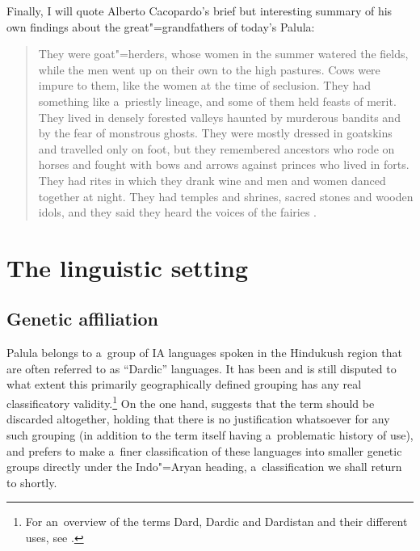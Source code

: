 Finally, I will quote Alberto Cacopardo's brief but interesting summary of his own findings about the great"=grandfathers of today's Palula:

\begin{quote}
They were goat"=herders, whose women in the summer watered the fields, while the men went up on their
own to the high pastures. Cows were impure to them, like the women at the time of seclusion. They
had something like a~priestly lineage, and some of them held feasts of merit. They lived in densely
forested valleys haunted by murderous bandits and by the fear of monstrous ghosts. They were mostly
dressed in goatskins and travelled only on foot, but they remembered ancestors who rode on horses
and fought with bows and arrows against princes who lived in forts. They had rites in which they
drank wine and men and women danced together at night. They had temples and shrines, sacred stones
and wooden idols, and they said they heard the voices of the fairies \citep[143]{cacopardo2001}.
\end{quote}

\section{The linguistic setting}
\label{sec:1-3}
\subsection{Genetic affiliation}
\label{subsec:1-3-1}
Palula belongs to a~group of IA languages spoken in the Hindukush region that are often referred to as ``Dardic'' languages. It has been and is still disputed to what extent this primarily geographically defined grouping has any real classificatory validity.\footnote{For an~overview of the terms Dard, Dardic and Dardistan and their different uses, see \citealt{mock1997}.} On the one hand, \citet[251]{strand2001} suggests that the term should be discarded altogether, holding that there is no justification whatsoever for any such grouping (in addition to the term itself having a~problematic history of use), and prefers to make a~finer classification of these languages into smaller genetic groups directly under the Indo"=Aryan heading, a~classification we shall return to shortly. 

